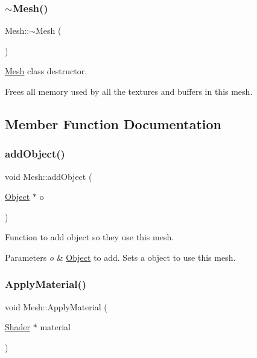 \subsubsection{\texorpdfstring{$\sim$\+Mesh()}{~Mesh()}}
{\footnotesize\ttfamily Mesh\+::$\sim$\+Mesh (\begin{DoxyParamCaption}{ }\end{DoxyParamCaption})}



\hyperlink{class_mesh}{Mesh} class destructor. 

Frees all memory used by all the textures and buffers in this mesh. 

\subsection{Member Function Documentation}
\mbox{\label{class_mesh_a81e2edec37429d2830a551d07476c7ba}} 
\subsubsection{\texorpdfstring{add\+Object()}{addObject()}}
{\footnotesize\ttfamily void Mesh\+::add\+Object (\begin{DoxyParamCaption}\item[{\hyperlink{class_object}{Object} $\ast$}]{o }\end{DoxyParamCaption})}



Function to add object so they use this mesh. 


\begin{DoxyParams}{Parameters}
{\em o} & \hyperlink{class_object}{Object} to add. Sets a object to use this mesh. \\
\hline
\end{DoxyParams}
\mbox{\label{class_mesh_a0cf8b6c8062509bd89d8bcc773f45c64}} 
\subsubsection{\texorpdfstring{Apply\+Material()}{ApplyMaterial()}}
{\footnotesize\ttfamily void Mesh\+::\+Apply\+Material (\begin{DoxyParamCaption}\item[{\hyperlink{class_shader}{Shader} $\ast$}]{material }\end{DoxyParamCaption})}




